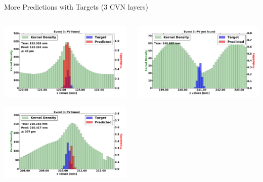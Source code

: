 \begin{frame}{More Predictions with Targets (3 CVN layers)}
  \begin{columns}[c]
        \begin{center}
            \includegraphics[width=1\textwidth,height=0.45\textwidth, trim=18 0 18 0]{images/120000_3layer_20.pdf}

            \includegraphics[width=1\textwidth, height=0.45\textwidth,trim=18 0 18 0]{images/120000_3layer_21.pdf}

        \end{center}
        \begin{center}
           \includegraphics[width=1\textwidth, height=0.45\textwidth, trim=18 0 18 0]{images/120000_3layer_22.pdf}


\end{center}
\end{columns}
\end{frame}
